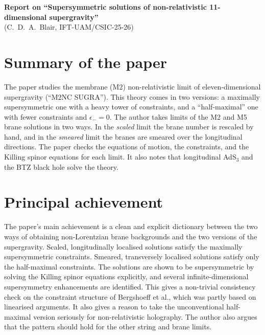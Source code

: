 \documentclass[11pt]{article}
\begin{document}
\begin{center}
{\Large \bf Report on ``Supersymmetric solutions of non-relativistic 11-dimensional supergravity''}\\[4pt]
{\large (C.~D.~A.~Blair, IFT-UAM/CSIC-25-26)}
\end{center}

\section*{Summary of the paper}
The paper studies the membrane (M2) non-relativistic limit of eleven-dimensional supergravity (``M2NC SUGRA''). This theory comes in two versions: a maximally supersymmetric one with a heavy tower of constraints, and a ``half-maximal'' one with fewer constraints and $\epsilon_-=0$. The author takes limits of the M2 and M5 brane solutions in two ways. In the \emph{scaled} limit the brane number is rescaled by hand, and in the \emph{smeared} limit the branes are smeared over the longitudinal directions. The paper checks the equations of motion, the constraints, and the Killing spinor equations for each limit. It also notes that longitudinal AdS$_3$ and the BTZ black hole solve the theory.

\section{Principal achievement}
The paper's main achievement is a clean and explicit dictionary between the two ways of obtaining non-Lorentzian brane backgrounds and the two versions of the supergravity. Scaled, longitudinally localised solutions satisfy the maximally supersymmetric constraints. Smeared, transversely localised solutions satisfy only the half-maximal constraints. The solutions are shown to be supersymmetric by solving the Killing spinor equations explicitly, and several infinite-dimensional supersymmetry enhancements are identified. This gives a non-trivial consistency check on the constraint structure of Bergshoeff et al., which was partly based on linearised arguments. It also gives a reason to take the unconventional half-maximal version seriously for non-relativistic holography. The author also argues that the pattern should hold for the other string and brane limits.
\end{document}
